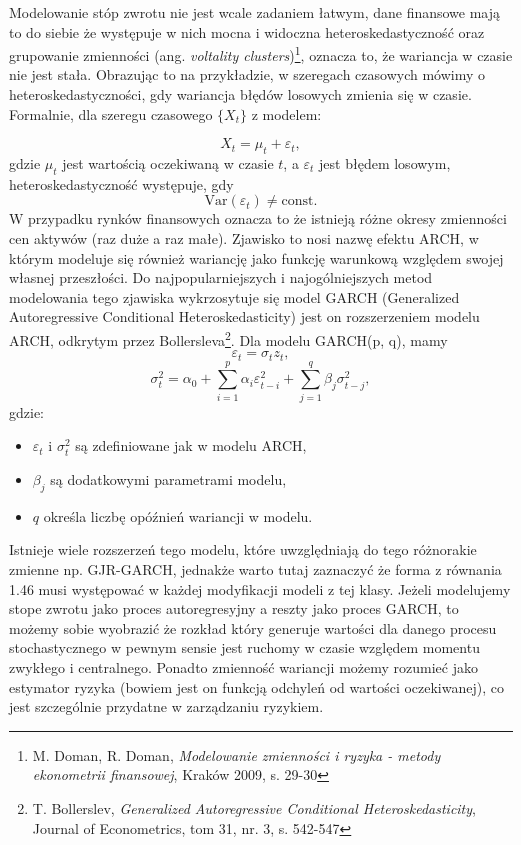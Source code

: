 \begin{enumerate}
Modelowanie stóp zwrotu nie jest wcale zadaniem łatwym, dane finansowe mają to do siebie że występuje w nich mocna i widoczna heteroskedastyczność oraz grupowanie zmienności (ang. \textit{voltality clusters})\footnote{M. Doman, R. Doman, \textit{Modelowanie zmienności i ryzyka - metody ekonometrii finansowej}, Kraków 2009, s. 29-30}, oznacza to, że wariancja w czasie nie jest stała. Obrazując to na przykładzie, w szeregach czasowych mówimy o heteroskedastyczności, gdy wariancja błędów losowych zmienia się w czasie. Formalnie, dla szeregu czasowego \( \{X_t\} \) z modelem:

\begin{equation}
X_t = \mu_t + \varepsilon_t,
\end{equation}
gdzie \( \mu_t \) jest wartością oczekiwaną w czasie \( t \), a \( \varepsilon_t \) jest błędem losowym, heteroskedastyczność występuje, gdy
\begin{equation}
\text{Var}(\varepsilon_t) \neq \text{const.}
\end{equation}
W przypadku rynków finansowych oznacza to że istnieją różne okresy zmienności cen aktywów (raz duże a raz małe). Zjawisko to nosi nazwę efektu ARCH, w którym modeluje się również wariancję jako funkcję warunkową względem swojej własnej przeszłości. Do najpopularniejszych i najogólniejszych metod modelowania tego zjawiska wykrzosytuje się model GARCH (Generalized Autoregressive Conditional Heteroskedasticity) jest on rozszerzeniem modelu ARCH, odkrytym przez Bollersleva\footnote{T. Bollerslev, \textit{Generalized Autoregressive Conditional Heteroskedasticity}, Journal of Econometrics, tom 31, nr. 3, s. 542-547}. Dla modelu GARCH(p, q), mamy
\begin{equation}
\varepsilon_t = \sigma_t z_t,
\end{equation}
\begin{equation}
\sigma_t^2 = \alpha_0 + \sum_{i=1}^{p} \alpha_i \varepsilon_{t-i}^2 + \sum_{j=1}^{q} \beta_j \sigma_{t-j}^2,
\end{equation}
gdzie:
\begin{itemize}
  \item \( \varepsilon_t \) i \( \sigma_t^2 \) są zdefiniowane jak w modelu ARCH,
  \item \( \beta_j \) są dodatkowymi parametrami modelu,
  \item \( q \) określa liczbę opóźnień wariancji w modelu.
\end{itemize}
Istnieje wiele rozszerzeń tego modelu, które uwzględniają do tego różnorakie zmienne np. GJR-GARCH, jednakże warto tutaj zaznaczyć że forma z równania 1.46 musi występować w każdej modyfikacji modeli z tej klasy.   
Jeżeli modelujemy stope zwrotu jako proces autoregresyjny a reszty jako proces GARCH, to możemy sobie wyobrazić że rozkład który generuje wartości dla danego procesu stochastycznego w pewnym sensie jest ruchomy w czasie względem momentu zwykłego i centralnego. Ponadto zmienność wariancji możemy rozumieć jako estymator ryzyka (bowiem jest on funkcją odchyleń od wartości oczekiwanej), co jest szczególnie przydatne w zarządzaniu ryzykiem.


\end{enumerate}
